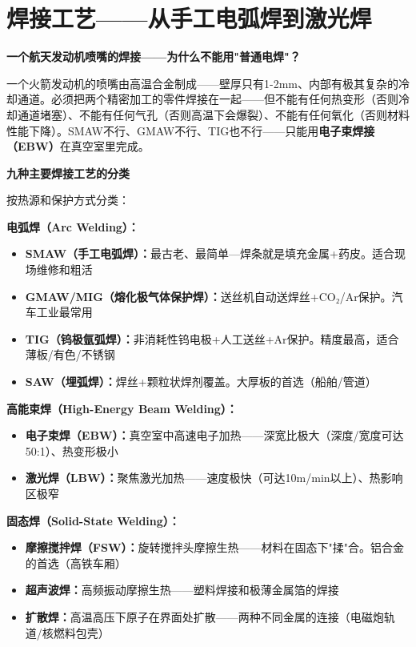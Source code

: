 \documentclass[a4paper,11pt]{ctexbook}
\newenvironment{scenario}{\vspace{0.4cm}\noindent\begin{tcolorbox}[colback=scenario!5!white,colframe=scenario!70!black,title=\textcolor{scenario}{\textbf{情景引入}}]\vspace{0.1cm}}{\end{tcolorbox}\vspace{0.3cm}}
\newenvironment{qualitative}{\vspace{0.3cm}\noindent\begin{tcolorbox}[colback=themeblue!5!white,colframe=themeblue!60!black,title=\textcolor{themeblue}{\textbf{定性分析}}]\vspace{0.1cm}}{\end{tcolorbox}\vspace{0.3cm}}
\begin{document}
\newpage
\chapter{焊接工艺——从手工电弧焊到激光焊}

\begin{scenario}
\textbf{一个航天发动机喷嘴的焊接——为什么不能用"普通电焊"？}

一个火箭发动机的喷嘴由高温合金制成——壁厚只有1-2mm、内部有极其复杂的冷却通道。必须把两个精密加工的零件焊接在一起——但不能有任何热变形（否则冷却通道堵塞）、不能有任何气孔（否则高温下会爆裂）、不能有任何氧化（否则材料性能下降）。SMAW不行、GMAW不行、TIG也不行——只能用\textbf{电子束焊接（EBW）}在真空室里完成。
\end{scenario}

\begin{qualitative}
\textbf{九种主要焊接工艺的分类}

按热源和保护方式分类：

\textbf{电弧焊（Arc Welding）：}
\begin{itemize}
  \item \textbf{SMAW（手工电弧焊）：}最古老、最简单—焊条就是填充金属+药皮。适合现场维修和粗活
  \item \textbf{GMAW/MIG（熔化极气体保护焊）：}送丝机自动送焊丝+CO₂/Ar保护。汽车工业最常用
  \item \textbf{TIG（钨极氩弧焊）：}非消耗性钨电极+人工送丝+Ar保护。精度最高，适合薄板/有色/不锈钢
  \item \textbf{SAW（埋弧焊）：}焊丝+颗粒状焊剂覆盖。大厚板的首选（船舶/管道）
\end{itemize}

\textbf{高能束焊（High-Energy Beam Welding）：}
\begin{itemize}
  \item \textbf{电子束焊（EBW）：}真空室中高速电子加热——深宽比极大（深度/宽度可达50:1）、热变形极小
  \item \textbf{激光焊（LBW）：}聚焦激光加热——速度极快（可达10m/min以上）、热影响区极窄
\end{itemize}

\textbf{固态焊（Solid-State Welding）：}
\begin{itemize}
  \item \textbf{摩擦搅拌焊（FSW）：}旋转搅拌头摩擦生热——材料在固态下"揉"合。铝合金的首选（高铁车厢）
  \item \textbf{超声波焊：}高频振动摩擦生热——塑料焊接和极薄金属箔的焊接
  \item \textbf{扩散焊：}高温高压下原子在界面处扩散——两种不同金属的连接（电磁炮轨道/核燃料包壳）
\end{itemize}
\end{qualitative}
\end{document}
